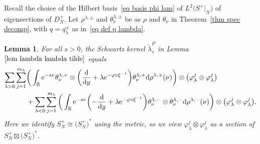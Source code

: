 \documentclass[pdftex]{sigma}%
\numberwithin{equation}{section}
\newtheorem{Lemma}[Theorem]{Lemma}
\newcommand{\R}{\mathbb{R}}
\begin{document}
 Recall the choice of the Hilbert basis~\eqref{eq basis phi lam} of $L^2\big(S^+|_N\big)$ of eigensections of $D_N^+$. Let $\rho^{\lambda, \pm}$ and $\theta^{\lambda, \pm}_{\nu}$ be as $\rho$ and $\theta_{\nu}$ in Theorem~\ref{thm spec decomp}, with $q = q^{\pm}_{\lambda}$ as in~\eqref{eq def q lambda}.
\begin{Lemma}\label{lem kernel APS}
For all $s>0$, the Schwartz kernel $\tilde \lambda_s^{P}$ in Lemma~$\ref{lem lambda lambda tilde}$ equals
\begin{align}
\sum_{\lambda >0} \sum_{j=1}^{m_{\lambda}}&\bigg(\int_{\R}
{\rm e}^{-s\nu} \theta^{\lambda, +}_{\nu}\otimes \bigg( \frac{\rm d}{{\rm d}y}+\lambda {\rm e}^{-\varphi \circ \xi^{-1}}\bigg) \theta^{\lambda, +}_{\nu} {\rm d}\rho^{\lambda, +}(\nu) \bigg)\otimes \big(\varphi_{\lambda}^j \otimes \varphi_{\lambda}^j \big)\nonumber
\\
&+ \sum_{\lambda <0}
 \sum_{j=1}^{m_{\lambda}}
\bigg(\int_{\R}
{\rm e}^{-s\nu} \biggl( - \frac{\rm d}{{\rm d}y}+\lambda {\rm e}^{-\varphi \circ \xi^{-1}}\biggr)\theta^{\lambda, -}_{\nu}\otimes \theta^{\lambda, -}_{\nu} {\rm d}\rho^{\lambda, -}(\nu) \bigg)\otimes \big(\varphi_{\lambda}^j \otimes \varphi_{\lambda}^j \big).
\label{eq kernel cusp contr}
\end{align}
Here we identify $S^+_N \cong \big(S^+_N\big)^*$ using the metric, so we view $\varphi_{\lambda}^j \otimes \varphi_{\lambda}^j$ as a section of $S^+_N \boxtimes \big(S^+_N\big)^*$.
\end{Lemma}
\end{document}

